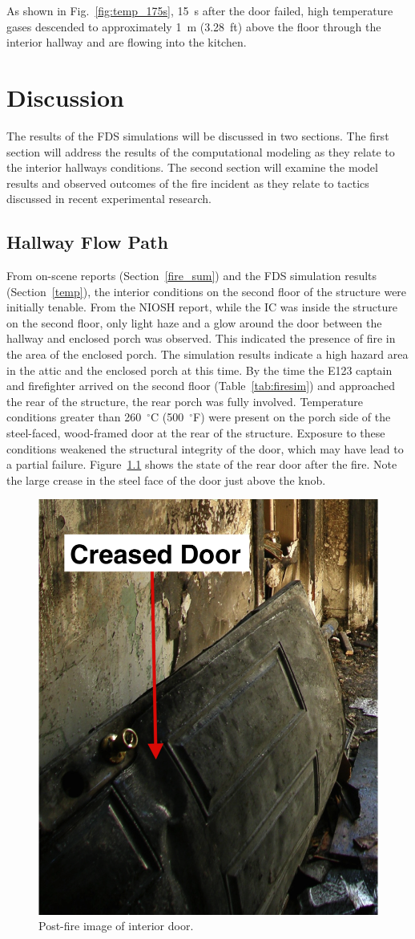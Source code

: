 \documentclass[12pt,oneside]{book}
\begin{document}
As shown in Fig.~\ref{fig:temp_175s}, 15~s after the door failed, high temperature gases descended to approximately 1~m (3.28~ft) above the floor through the interior hallway and are flowing into the kitchen.


\chapter{Discussion}
\label{discussion}
The results of the FDS simulations will be discussed in two sections. The first section will address the results of the computational modeling as they relate to the interior hallways conditions. The second section will examine the model results and observed outcomes of the fire incident as they relate to tactics discussed in recent experimental research. 

\section{Hallway Flow Path}
From on-scene reports (Section~\ref{fire_sum}) and the FDS simulation results (Section~\ref{temp}), the interior conditions on the second floor of the structure were initially tenable. From the NIOSH report, while the IC was inside the structure on the second floor, only light haze and a glow around the door between the hallway and enclosed porch was observed. This indicated the presence of fire in the area of the enclosed porch. The simulation results indicate a high hazard area in the attic and the enclosed porch at this time. By the time the E123 captain and firefighter arrived on the second floor (Table~\ref{tab:firesim}) and approached the rear of the structure, the rear porch was fully involved. Temperature conditions greater than 260~$^{\circ}$C (500~$^{\circ}$F) were present on the porch side of the steel-faced, wood-framed door at the rear of the structure. Exposure to these conditions weakened the structural integrity of the door, which may have lead to a partial failure. Figure~\ref{fig:chicago_doorfold} shows the state of the rear door after the fire. Note the large crease in the steel face of the door just above the knob.

\begin{figure}[!ht]
\centering
\includegraphics[width=.4\textwidth]{../Figures/Porch_Door_1}
\caption{Post-fire image of interior door.}
\label{fig:chicago_doorfold}
\end{figure}
\end{document}
